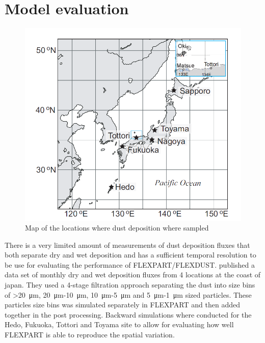 \section{Model evaluation}\label{sec:model_eval}
\begin{figure}
    \centering
    \includegraphics[scale=0.45]{texfiles/figs/Osada_locations.PNG}
    \caption{Map of the locations where dust deposition where sampled \parencite{osada2014wet}}
    \label{fig:map_japan}
\end{figure}
There is a very limited amount of measurements of dust deposition fluxes that both separate dry and wet deposition and has a sufficient temporal resolution to be use for evaluating the performance of FLEXPART/FLEXDUST. \textcite{osada2014wet} published a data set of monthly dry and wet deposition fluxes from 4 locations at the coast of japan. They used a 4-stage filtration approach separating the dust into size bins of  >\SI{20}{\micro\metre}, \SI{20}{\micro\metre}-\SI{10}{\micro\metre}, \SI{10}{\micro\metre}-\SI{5}{\micro\metre} and \SI{5}{\micro\metre}-\SI{1}{\micro\metre} sized particles. These particles size bins was simulated separately in FLEXPART and then added together in the post processing. Backward simulations where conducted for the Hedo, Fukuoka, Tottori and Toyama site to allow for evaluating how well FLEXPART is able to reproduce the spatial variation. 

